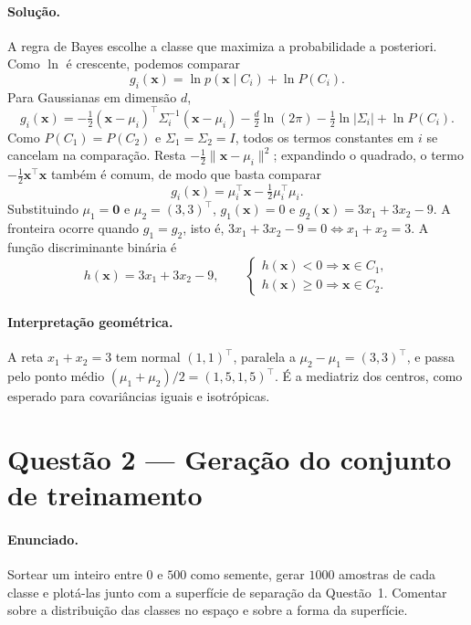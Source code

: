 ﻿\documentclass[12pt,a4paper]{article}
\begin{document}
\paragraph{Solu\c{c}\~ao.} A regra de Bayes escolhe a classe que
maximiza a probabilidade a posteriori. Como $\ln$ \'e crescente,
podemos comparar
\[
g_i(\mathbf{x})=\ln p(\mathbf{x}\mid C_i)+\ln P(C_i).
\]
Para Gaussianas em dimens\~ao $d$,
\[
g_i(\mathbf{x})=
-\tfrac12(\mathbf{x}-\mu_i)^\top\Sigma_i^{-1}(\mathbf{x}-\mu_i)
-\tfrac{d}{2}\ln(2\pi)-\tfrac12\ln|\Sigma_i|+\ln P(C_i).
\]
Como $P(C_1)=P(C_2)$ e $\Sigma_1=\Sigma_2=I$, todos os termos
constantes em $i$ se cancelam na compara\c{c}\~ao. Resta
$-\tfrac12\|\mathbf{x}-\mu_i\|^2$; expandindo o quadrado, o termo
$-\tfrac12\mathbf{x}^\top\mathbf{x}$ tamb\'em \'e comum, de modo que basta comparar
\[
g_i(\mathbf{x})=\mu_i^\top\mathbf{x}-\tfrac12\mu_i^\top\mu_i.
\]
Substituindo $\mu_1=\mathbf{0}$ e $\mu_2=(3,3)^\top$,
$g_1(\mathbf{x})=0$ e $g_2(\mathbf{x})=3x_1+3x_2-9$. A fronteira ocorre quando
$g_1=g_2$, isto \'e, $3x_1+3x_2-9=0\Leftrightarrow x_1+x_2=3$. A
fun\c{c}\~ao discriminante bin\'aria \'e
\[
h(\mathbf{x})=3x_1+3x_2-9,\qquad
\begin{cases}
h(\mathbf{x})<0\Rightarrow \mathbf{x}\in C_1,\\
h(\mathbf{x})\ge 0\Rightarrow \mathbf{x}\in C_2.
\end{cases}
\]

\paragraph{Interpreta\c{c}\~ao geom\'etrica.} A reta $x_1+x_2=3$ tem
normal $(1,1)^\top$, paralela a $\mu_2-\mu_1=(3,3)^\top$, e passa pelo
ponto m\'edio $(\mu_1+\mu_2)/2=(1{,}5,1{,}5)^\top$. \'E a mediatriz dos
centros, como esperado para covari\^ancias iguais e isotr\'opicas.

\section*{Quest\~ao 2 --- Gera\c{c}\~ao do conjunto de treinamento}

\paragraph{Enunciado.} Sortear um inteiro entre $0$ e $500$ como
semente, gerar $1000$ amostras de cada classe e plot\'a-las junto com a
superf\'icie de separa\c{c}\~ao da Quest\~ao~1. Comentar sobre a
distribui\c{c}\~ao das classes no espa\c{c}o e sobre a forma da
superf\'icie.
\end{document}
